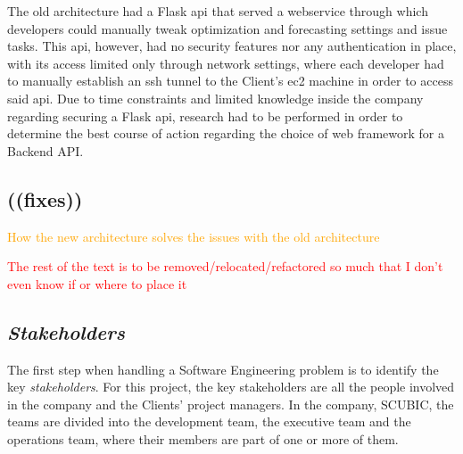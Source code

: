 The old architecture had a Flask \gls{api} that served a webservice through which developers could manually tweak optimization and forecasting settings and issue tasks. This api, however, had no security features nor any authentication in place, with its access limited only through network settings, where each developer had to manually establish an \gls{ssh} tunnel to the Client's \gls{ec2} machine in order to access said api. Due to time constraints and limited knowledge inside the company regarding securing a Flask api, research had to be performed in order to determine the best course of action regarding the choice of web framework for a Backend API.

\subsection{((fixes))}\label{methodology:ss:fixes}
\textcolor{orange}{How the new architecture solves the issues with the old architecture}



\textcolor{red}{The rest of the text is to be removed/relocated/refactored so much that I don't even know if or where to place it}



\subsection{\textit{Stakeholders}}\label{methodology:s:stakeholders}

The first step when handling a Software Engineering problem is to identify the key \textit{stakeholders}. For this project, the key stakeholders are all the people involved in the company and the Clients' project managers. In the company, SCUBIC, the teams are divided into the development team, the executive team and the operations team, where their members are part of one or more of them.